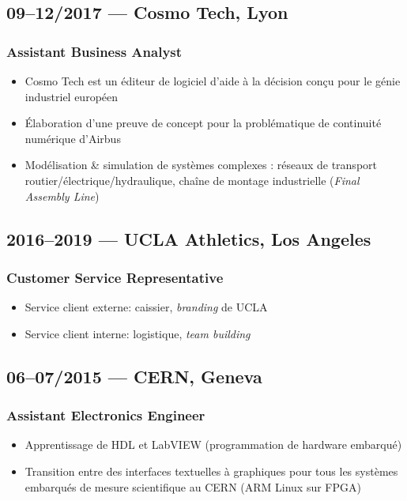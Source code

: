 \documentclass[10pt]{article}
\begin{document}
\subsection*{09--12/2017 --- Cosmo Tech, Lyon}
\subsubsection*{Assistant Business Analyst}
\begin{itemize}
    \item Cosmo Tech est un éditeur de logiciel d’aide à la décision conçu pour le génie industriel européen
    \item Élaboration d’une preuve de concept pour la problématique de continuité numérique d’Airbus
    \item Modélisation \& simulation de systèmes complexes : réseaux de transport routier/électrique/hydraulique, chaîne de montage industrielle (\textit{Final Assembly Line})
\end{itemize}
\subsection*{2016--2019 --- UCLA Athletics, Los Angeles}
\subsubsection*{Customer Service Representative}
\begin{itemize}
    \item Service client externe: caissier, \textit{branding} de UCLA
    \item Service client interne: logistique, \textit{team building}
\end{itemize}
\subsection*{06--07/2015 --- CERN, Geneva}
\subsubsection*{Assistant Electronics Engineer}
\begin{itemize}
    \item Apprentissage de HDL et LabVIEW (programmation de hardware embarqué)
    \item Transition entre des interfaces textuelles à graphiques pour tous les systèmes embarqués de mesure scientifique au CERN (ARM Linux sur FPGA)
\end{itemize}
\end{document}
